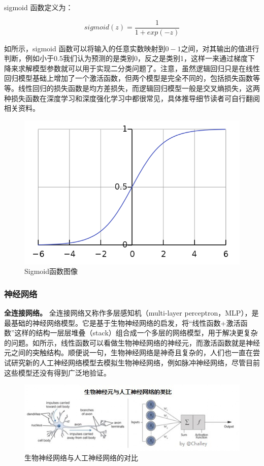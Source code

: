 sigmoid 函数定义为：

\begin{equation}
    sigmoid(z) = \frac{1}{1+exp(-z)}
\end{equation}

如所示，sigmoid 函数可以将输入的任意实数映射到$0-1$之间，对其输出的值进行判断，例如小于0.5我们认为预测的是类别0，反之是类别1，这样一来通过梯度下降来求解模型参数就可以用于实现二分类问题了。注意，虽然逻辑回归只是在线性回归模型基础上增加了一个激活函数，但两个模型是完全不同的，包括损失函数等等。线性回归的损失函数是均方差损失，而逻辑回归模型一般是交叉熵损失，这两种损失函数在深度学习和深度强化学习中都很常见，具体推导细节读者可自行翻阅相关资料。

\begin{figure}[hbt]
    \centering
    \includegraphics[width=0.5\linewidth]{ch4/figs/sigmoid.png}
    \caption{Sigmoid函数图像}
    \label{fig:sigmoid}
\end{figure}

\subsubsection{神经网络}

{\bfseries 全连接网络。} 全连接网络又称作多层感知机（multi-layer perceptron，MLP），是最基础的神经网络模型。它是基于生物神经网络的启发，将“线性函数+激活函数”这样的结构一层层堆叠（stack）组合成一个多层的网络模型，用于解决更复杂的问题。如所示，线性函数可以看做生物神经网络的神经元，而激活函数就是神经元之间的突触结构。顺便说一句，生物神经网络是神奇且复杂的，人们也一直在尝试研究新的人工神经网络模型去模拟生物神经网络，例如脉冲神经网络，尽管目前这些模型还没有得到广泛地验证。

\begin{figure}[hbt]
    \centering
    \includegraphics[width=0.5\linewidth]{ch4/figs/ann_vs_dnn.png}
    \caption{生物神经网络与人工神经网络的对比}
    \label{fig:ann_vs_dnn}
\end{figure}


